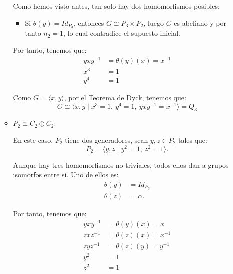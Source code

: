 \begin{ejercicio}
\begin{enumerate}
\begin{itemize}
            Como hemos visto antes, tan solo hay dos homomorfismos posibles:
            \begin{itemize}
                \item Si \(\theta(y) = Id_{P_3}\), entonces $G\cong P_3\times P_2$, luego \(G\) es abeliano y por tanto $n_2=1$, lo cual contradice el supuesto inicial.
            \end{itemize}

            Por tanto, tenemos que:
            \begin{align*}
                yxy^{-1} &= \theta(y)(x) = x^{-1}\\
                x^3 &= 1\\
                y^4 &= 1
            \end{align*}

            Como $G=\langle x,y\rangle$, por el Teorema de Dyck, tenemos que:
            \begin{equation*}
                G\cong \langle x, y\mid x^3=1,\ y^4=1,\ yxy^{-1}=x^{-1}\rangle = Q_3
            \end{equation*}

            \item $P_2\cong C_2\oplus C_2$:
            
            En este caso, $P_2$ tiene dos generadores, sean $y,z\in P_2$ tales que:
            \begin{equation*}
                P_2 = \langle y, z\mid y^2=1,\ z^2=1\rangle.
            \end{equation*}

            Aunque hay tres homomorfismos no triviales, todos ellos dan a grupos isomorfos entre sí. Uno de ellos es:
            \begin{align*}
                \theta(y) &= Id_{P_3}\\
                \theta(z) &= \alpha.
            \end{align*}

            Por tanto, tenemos que:
            \begin{align*}
                yxy^{-1} &= \theta(y)(x) = x\\
                zxz^{-1} &= \theta(z)(x) = x^{-1}\\
                zyz^{-1} &= \theta(z)(y) = y^{-1}\\
                y^2 &= 1\\
                z^2 &= 1
            \end{align*}


\end{itemize}
\end{enumerate}
\end{ejercicio}
